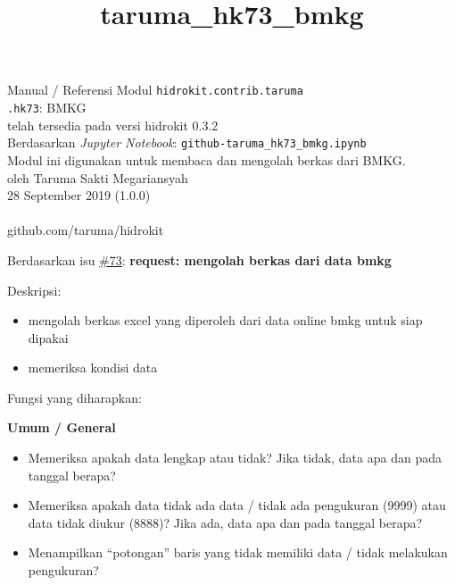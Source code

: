 \documentclass[11pt]{article}
\title{taruma\_hk73\_bmkg}
\providecommand{\tightlist}{%
      \setlength{\itemsep}{0pt}\setlength{\parskip}{0pt}}
\begin{document}
  
	\begin{titlepage}
		\vspace*{\fill}
		\begin{center}
 		\normalsize Manual / Referensi Modul \texttt{hidrokit.contrib.taruma}\\
		\huge \texttt{.hk73}: BMKG\\ 
		\small telah tersedia pada versi hidrokit 0.3.2 \\[0.2cm]
      	\small Berdasarkan \emph{Jupyter Notebook}: \texttt{github-taruma\_hk73\_bmkg.ipynb} \\[0.5cm]
      	\small Modul ini digunakan untuk membaca dan mengolah berkas dari BMKG. \\[0.5cm]
		\normalsize oleh Taruma Sakti Megariansyah\\[0.5cm]
      	\normalsize 28 September 2019 (1.0.0)\\[1cm]
    	\\
      	\normalsize github.com/taruma/hidrokit
		\end{center}
    	\vspace*{\fill}
	\end{titlepage}
    
    

    
    

    Berdasarkan isu
\href{https://github.com/taruma/hidrokit/issues/73}{\#73}:
\textbf{request: mengolah berkas dari data bmkg}

Deskripsi:

\begin{itemize}
\tightlist
\item
  mengolah berkas excel yang diperoleh dari data online bmkg untuk siap
  dipakai
\item
  memeriksa kondisi data
\end{itemize}

Fungsi yang diharapkan:

\textbf{Umum / General}

\begin{itemize}
\tightlist
\item
  Memeriksa apakah data lengkap atau tidak? Jika tidak, data apa dan
  pada tanggal berapa?
\item
  Memeriksa apakah data tidak ada data / tidak ada pengukuran (9999)
  atau data tidak diukur (8888)? Jika ada, data apa dan pada tanggal
  berapa?
\item
  Menampilkan ``potongan'' baris yang tidak memiliki data / tidak
  melakukan pengukuran?
\end{itemize}
\end{document}

